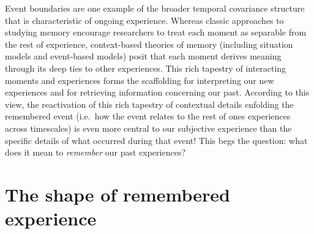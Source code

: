 \documentclass{article}
\begin{document}
Event boundaries are one example of the broader temporal covariance structure that is characteristic of ongoing experience.  Whereas classic approaches to studying memory encourage researchers to treat each moment as separable from the rest of experience, context-based theories of memory (including situation models and event-based models) posit that each moment derives meaning through its deep ties to other experiences.  This rich tapestry of interacting moments and experiences forms the scaffolding for interpreting our new experiences and for retrieving information concerning our past.  According to this view, the reactivation of this rich tapestry of contextual details enfolding the remembered event (i.e.\ how the event relates to the rest of ones experiences across timescales) is even more central to our subjective experience than the specific details of what occurred during that event!  This begs the question: what does it mean to \textit{remember} our past experiences?

\section*{The shape of remembered experience}
\end{document}
